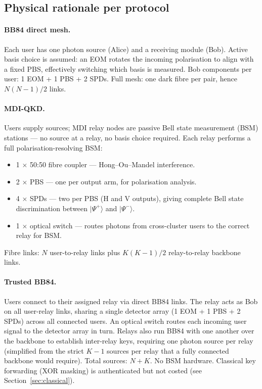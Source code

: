 \documentclass[12pt,a4paper]{article}
\begin{document}
\subsection{Physical rationale per protocol}

\paragraph{BB84 direct mesh.}
Each user has one photon source (Alice) and a receiving module (Bob).
Active basis choice is assumed: an EOM rotates the incoming polarisation
to align with a fixed PBS, effectively switching which basis is measured.
Bob components per user: 1 EOM + 1 PBS + 2 SPDs. Full mesh: one dark
fibre per pair, hence $N(N{-}1)/2$ links.

\paragraph{MDI-QKD.}
Users supply sources; MDI relay nodes are passive Bell state measurement
(BSM) stations --- no source at a relay, no basis choice required.
Each relay performs a full polarisation-resolving BSM:
\begin{itemize}
  \item 1 $\times$ 50:50 fibre coupler --- Hong--Ou--Mandel interference.
  \item 2 $\times$ PBS --- one per output arm, for polarisation analysis.
  \item 4 $\times$ SPDs --- two per PBS (H and V outputs), giving complete
        Bell state discrimination between $|\Psi^+\rangle$ and $|\Psi^-\rangle$.
  \item 1 $\times$ optical switch --- routes photons from cross-cluster users
        to the correct relay for BSM.
\end{itemize}
Fibre links: $N$ user-to-relay links plus $K(K{-}1)/2$ relay-to-relay backbone links.

\paragraph{Trusted BB84.}
Users connect to their assigned relay via direct BB84 links. The relay acts
as Bob on all user-relay links, sharing a single detector array (1 EOM +
1 PBS + 2 SPDs) across all connected users. An optical switch routes each
incoming user signal to the detector array in turn. Relays also run BB84
with one another over the backbone to establish inter-relay keys, requiring
one photon source per relay (simplified from the strict $K{-}1$ sources per
relay that a fully connected backbone would require). Total sources: $N + K$.
No BSM hardware. Classical key forwarding (XOR masking) is authenticated
but not costed (see Section~\ref{sec:classical}).
\end{document}
